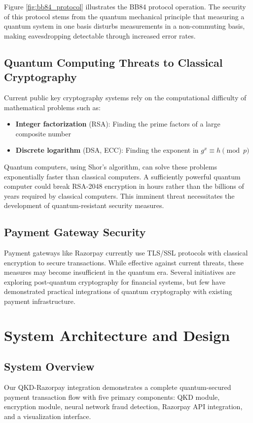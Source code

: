 \documentclass[onecolumn,a4paper,10pt]{IEEEtran}
\begin{document}
Figure \ref{fig:bb84_protocol} illustrates the BB84 protocol operation. The security of this protocol stems from the quantum mechanical principle that measuring a quantum system in one basis disturbs measurements in a non-commuting basis, making eavesdropping detectable through increased error rates.

\subsection{Quantum Computing Threats to Classical Cryptography}
Current public key cryptography systems rely on the computational difficulty of mathematical problems such as:

\begin{itemize}
    \item \textbf{Integer factorization} (RSA): Finding the prime factors of a large composite number
    \item \textbf{Discrete logarithm} (DSA, ECC): Finding the exponent in $g^x \equiv h \pmod{p}$
\end{itemize}

Quantum computers, using Shor's algorithm, can solve these problems exponentially faster than classical computers. A sufficiently powerful quantum computer could break RSA-2048 encryption in hours rather than the billions of years required by classical computers. This imminent threat necessitates the development of quantum-resistant security measures.

\subsection{Payment Gateway Security}
Payment gateways like Razorpay currently use TLS/SSL protocols with classical encryption to secure transactions. While effective against current threats, these measures may become insufficient in the quantum era. Several initiatives are exploring post-quantum cryptography for financial systems, but few have demonstrated practical integrations of quantum cryptography with existing payment infrastructure.

\section{System Architecture and Design}
\setcounter{figure}{0}
\setcounter{table}{0}

\subsection{System Overview}
\begin{keypoint}
Our QKD-Razorpay integration demonstrates a complete quantum-secured payment transaction flow with five primary components: QKD module, encryption module, neural network fraud detection, Razorpay API integration, and a visualization interface.
\end{keypoint}
\end{document}
